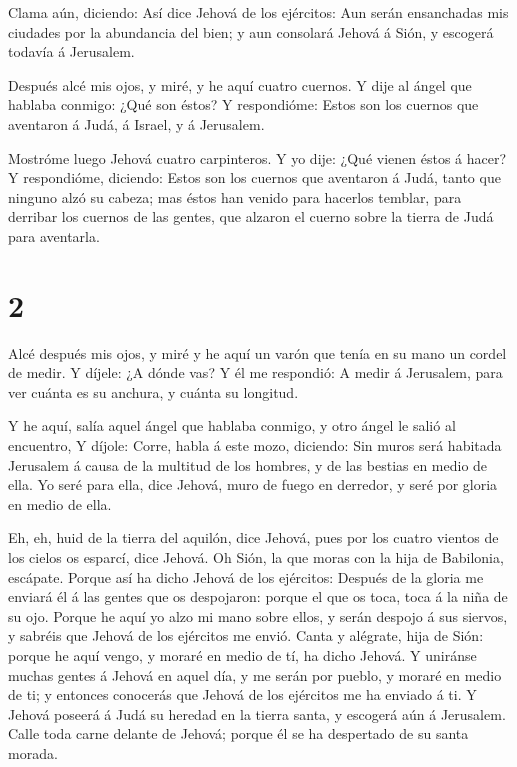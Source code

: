  Clama aún, diciendo: Así dice Jehová de los ejércitos: Aun
serán ensanchadas mis ciudades por la abundancia del bien; y aun
consolará Jehová á Sión, y escogerá todavía á Jerusalem.

 Después alcé mis ojos, y miré, y he aquí cuatro cuernos.
 Y dije al ángel que hablaba conmigo: ¿Qué son éstos? Y
respondióme: Estos son los cuernos que aventaron á Judá, á Israel, y á
Jerusalem.

 Mostróme luego Jehová cuatro carpinteros.  Y
yo dije: ¿Qué vienen éstos á hacer? Y respondióme, diciendo: Estos son
los cuernos que aventaron á Judá, tanto que ninguno alzó su cabeza; mas
éstos han venido para hacerlos temblar, para derribar los cuernos de las
gentes, que alzaron el cuerno sobre la tierra de Judá para aventarla.

\hypertarget{section-1}{%
\section{2}\label{section-1}}

 Alcé después mis ojos, y miré y he aquí un varón que tenía
en su mano un cordel de medir.  Y díjele: ¿A dónde vas? Y él
me respondió: A medir á Jerusalem, para ver cuánta es su anchura, y
cuánta su longitud.

 Y he aquí, salía aquel ángel que hablaba conmigo, y otro
ángel le salió al encuentro,  Y díjole: Corre, habla á este
mozo, diciendo: Sin muros será habitada Jerusalem á causa de la multitud
de los hombres, y de las bestias en medio de ella.  Yo seré
para ella, dice Jehová, muro de fuego en derredor, y seré por gloria en
medio de ella.

 Eh, eh, huid de la tierra del aquilón, dice Jehová, pues
por los cuatro vientos de los cielos os esparcí, dice Jehová.
 Oh Sión, la que moras con la hija de Babilonia, escápate.
 Porque así ha dicho Jehová de los ejércitos: Después de la
gloria me enviará él á las gentes que os despojaron: porque el que os
toca, toca á la niña de su ojo.  Porque he aquí yo alzo mi
mano sobre ellos, y serán despojo á sus siervos, y sabréis que Jehová de
los ejércitos me envió.  Canta y alégrate, hija de Sión:
porque he aquí vengo, y moraré en medio de tí, ha dicho Jehová.
 Y uniránse muchas gentes á Jehová en aquel día, y me serán
por pueblo, y moraré en medio de ti; y entonces conocerás que Jehová de
los ejércitos me ha enviado á ti.  Y Jehová poseerá á Judá
su heredad en la tierra santa, y escogerá aún á Jerusalem. 
Calle toda carne delante de Jehová; porque él se ha despertado de su
santa morada.

